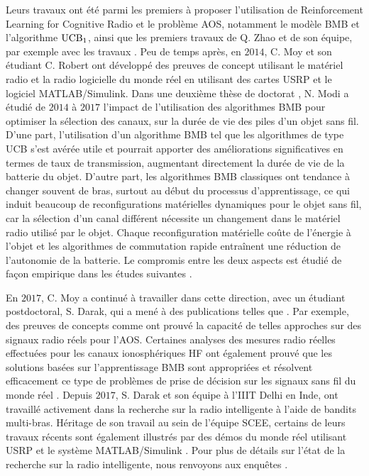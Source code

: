 \begin{resume_fr}
Leurs travaux ont été parmi les premiers à proposer l'utilisation de Reinforcement Learning for Cognitive Radio et le problème AOS, notamment le modèle BMB et l'algorithme $\mathrm{UCB}_1$,
ainsi que les premiers travaux de Q. Zhao et de son équipe, par exemple avec les travaux \cite{Liu08,Zhao10}.
%
Peu de temps après, en $2014$, C. Moy et son étudiant C. Robert \cite{RobertSDR2014,MoyWSR2014,MoyWSR2014} ont développé des preuves de concept utilisant le matériel radio et la radio logicielle du monde réel en utilisant des cartes USRP et le logiciel MATLAB/Simulink.
Dans une deuxième thèse de doctorat \cite{Modi17PhD}, N. Modi a étudié de $2014$ à $2017$ l'impact de l'utilisation des algorithmes BMB pour optimiser la sélection des canaux, sur la durée de vie des piles d'un objet sans fil.
D'une part, l'utilisation d'un algorithme BMB tel que les algorithmes de type UCB s'est avérée utile et pourrait apporter des améliorations significatives en termes de taux de transmission, augmentant directement la durée de vie de la batterie du objet.
D'autre part, les algorithmes BMB classiques ont tendance à changer souvent de bras, surtout au début du processus d'apprentissage, ce qui induit beaucoup de reconfigurations matérielles dynamiques pour le objet sans fil, car la sélection d'un canal différent nécessite un changement dans le matériel radio utilisé par le objet.
Chaque reconfiguration matérielle coûte de l'énergie à l'objet et les algorithmes de commutation rapide entraînent une réduction de l'autonomie de la batterie.
Le compromis entre les deux aspects est étudié de façon empirique dans les études suivantes
\cite{modiDemo2016}.


En $2017$, C. Moy a continué à travailler dans cette direction, avec un étudiant postdoctoral, S. Darak, qui a mené à des publications telles que
\cite{darak2016bayesian,Darak16}.
%
Par exemple, des preuves de concepts comme \cite{kumar2016two} ont prouvé la capacité de telles approches sur des signaux radio réels pour l'AOS.
%
Certaines analyses des mesures radio réelles effectuées pour les canaux ionosphériques HF ont également prouvé que les solutions basées sur l'apprentissage BMB sont appropriées et résolvent efficacement ce type de problèmes de prise de décision sur les signaux sans fil du monde réel \cite{Melian15}.
%
Depuis $2017$, S. Darak et son équipe à l'IIIT Delhi en Inde, ont travaillé activement dans la recherche sur la radio intelligente à l'aide de bandits multi-bras.
Héritage de son travail au sein de l'équipe SCEE,
certains de leurs travaux récents sont également illustrés par des démos du monde réel utilisant USRP et le système MATLAB/Simulink
\cite{KumarYadav2018,SawantKumar2018,JoshiKumar2018}.
%
Pour plus de détails sur l'état de la recherche sur la radio intelligente, nous renvoyons aux enquêtes \cite{garhwal2012survey,marinho2012cognitive}.



\end{resume_fr}
